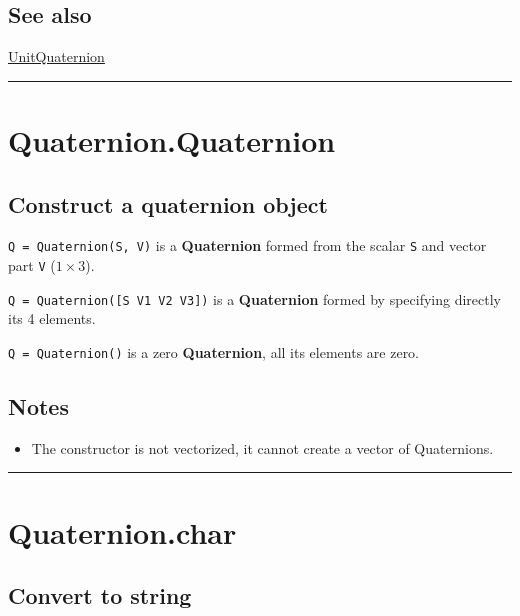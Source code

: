 \subsection*{See also}


\hyperlink{UnitQuaternion}{\color{blue} UnitQuaternion}

\vspace{1.5ex}\hrule

\hypertarget{Quaternion.Quaternion}{\section*{Quaternion.Quaternion}}
\subsection*{Construct a quaternion object}


\texttt{Q = Quaternion(S, V)} is a \textbf{\color{red} Quaternion} formed from the scalar \texttt{S} and vector
part \texttt{V} ($1 \times 3$).



\texttt{Q = Quaternion([S V1 V2 V3])} is a \textbf{\color{red} Quaternion} formed by specifying directly its 4 elements.



\texttt{Q = Quaternion()} is a zero \textbf{\color{red} Quaternion}, all its elements are zero.


\subsection*{Notes}
\begin{itemize}
  \item The constructor is not vectorized, it cannot create a vector of Quaternions.
\end{itemize}
\vspace{1.5ex}\hrule

\hypertarget{Quaternion.char}{\section*{Quaternion.char}}
\subsection*{Convert to string}


